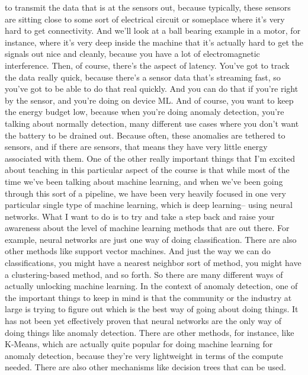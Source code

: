   to transmit the data that is at the sensors out,
  because typically, these sensors are sitting
  close to some sort of electrical circuit or someplace
  where it's very hard to get connectivity.
  And we'll look at a ball bearing example in a motor,
  for instance, where it's very deep inside the machine
  that it's actually hard to get the signals out nice and cleanly,
  because you have a lot of electromagnetic interference.
  Then, of course, there's the aspect of latency.
  You've got to track the data really quick,
  because there's a sensor data that's streaming fast,
  so you've got to be able to do that real quickly.
  And you can do that if you're right by the sensor,
  and you're doing on device ML.
  And of course, you want to keep the energy budget low,
  because when you're doing anomaly detection,
  you're talking about normally detection, many different use
  cases where you don't want the battery to be drained out.
  Because often, these anomalies are tethered to sensors,
  and if there are sensors, that means they have very little energy
  associated with them.
  One of the other really important things that I'm
  excited about teaching in this particular aspect of the course
  is that while most of the time we've been talking about machine learning,
  and when we've been going through this sort of a pipeline,
  we have been very heavily focused in one very particular single type of machine
  learning, which is deep learning-- using neural networks.
  What I want to do is to try and take a step back and raise your awareness
  about the level of machine learning methods that are out there.
  For example, neural networks are just one way of doing classification.
  There are also other methods like support vector machines.
  And just the way we can do classifications,
  you might have a nearest neighbor sort of method,
  you might have a clustering-based method, and so forth.
  So there are many different ways of actually unlocking machine learning.
  In the context of anomaly detection, one of the important things to keep in mind
  is that the community or the industry at large
  is trying to figure out which is the best way of going about doing things.
  It has not been yet effectively proven that neural networks are the only way
  of doing things like anomaly detection.
  There are other methods, for instance, like K-Means,
  which are actually quite popular for doing machine learning
  for anomaly detection, because they're very lightweight in terms
  of the compute needed.
  There are also other mechanisms like decision trees that can be used.
